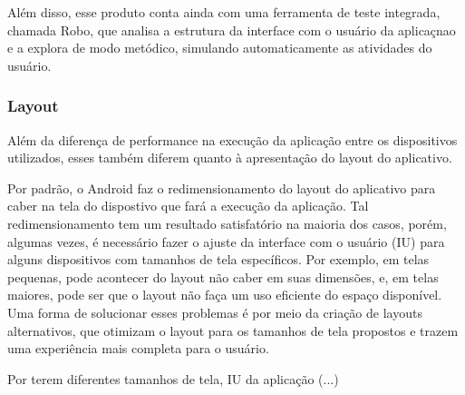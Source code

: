 Além disso, esse produto conta ainda com uma ferramenta de teste integrada, chamada Robo, que analisa a estrutura da interface com o usuário da aplicaçnao e a explora de modo metódico, simulando automaticamente as atividades do usuário.

\subsubsection{Layout}

Além da diferença de performance na execução da aplicação entre os dispositivos utilizados, esses também diferem quanto à apresentação do layout do aplicativo. 

Por padrão, o Android faz o redimensionamento do layout do aplicativo para caber na tela do dispostivo que fará a execução da aplicação. Tal redimensionamento tem um resultado satisfatório na maioria dos casos, porém, algumas vezes, é necessário fazer o ajuste da interface com o usuário (IU) para alguns dispositivos com tamanhos de tela específicos. Por exemplo, em telas pequenas, pode acontecer do layout não caber em suas dimensões, e, em telas maiores, pode ser que o layout não faça um uso eficiente do espaço disponível. Uma forma de solucionar esses problemas é por meio da criação de layouts alternativos, que otimizam o layout para os tamanhos de tela propostos e trazem uma experiência mais completa para o usuário. 

Por terem diferentes tamanhos de tela, IU da aplicação (...)
    